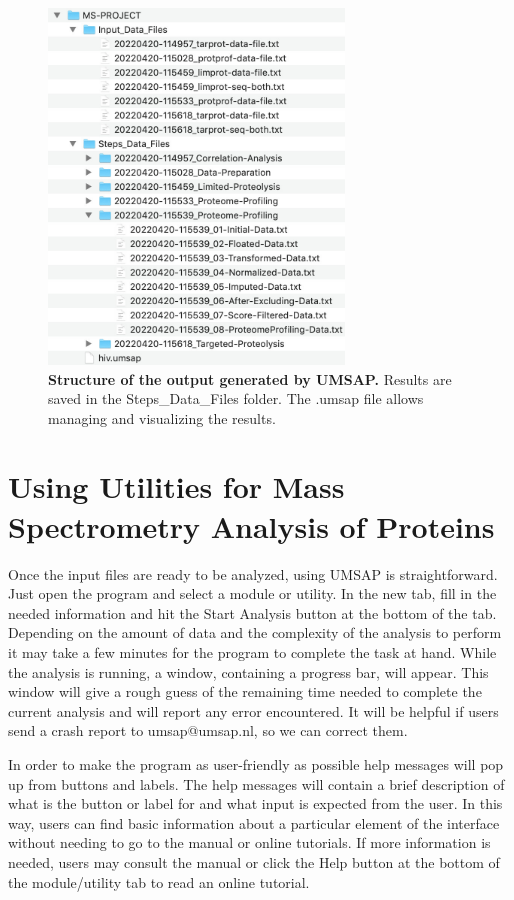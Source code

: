 \begin{figure}[h]
    \centering
    \includegraphics[width=0.7\textwidth]{./IMAGES/OUTPUT/folder.jpg}
    \caption[Structure of the output generated by UMSAP]{\textbf{Structure of the
output generated by UMSAP.} Results are saved in the Steps{\_}Data{\_}Files folder. The
.umsap file allows managing and visualizing the results.} 
    \label{fig:outFolder}
    \vspace{-5pt}
\end{figure}

\section{Using Utilities for Mass Spectrometry Analysis of Proteins}

Once the input files are ready to be analyzed, using UMSAP is straightforward. Just
open the program and select a module or utility. In the new tab, fill in the needed
information and hit the Start Analysis button at the bottom of the tab. Depending on
the amount of data and the complexity of the analysis to perform it may take a few
minutes for the program to complete the task at hand. While the analysis is running, a
window, containing a progress bar, will appear. This window will give a rough guess
of the remaining time needed to complete the current analysis and will report any error
encountered. It will be helpful if users send a crash report to umsap@umsap.nl, so we
can correct them. 

In order to make the program as user-friendly as possible help messages will pop up
from buttons and labels. The help messages will contain a brief description of what
is the button or label for and what input is expected from the user. In this way, users
can find basic information about a particular element of the interface without needing
to go to the manual or online tutorials. If more information is needed, users may
consult the manual or click the Help button at the bottom of the module/utility tab to
read an online tutorial. 

